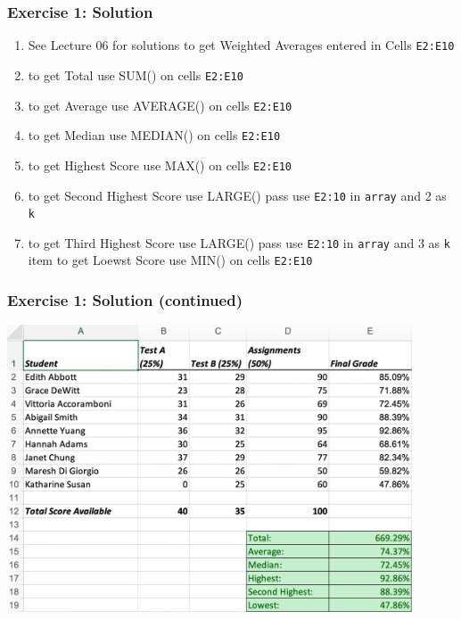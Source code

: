 \documentclass[12pt]{beamer}
\begin{document}
\begin{frame}
	\frametitle{Exercise 1: Solution}
	\begin{enumerate}
		\item See Lecture 06 for solutions to get Weighted Averages entered in Cells \texttt{E2:E10}
		\item to get Total use SUM() on cells \texttt{E2:E10}
		\item to get Average use AVERAGE() on cells \texttt{E2:E10}
		\item to get Median use MEDIAN() on cells \texttt{E2:E10}
		\item to get Highest Score use MAX() on cells \texttt{E2:E10}
		\item to get Second Highest Score use LARGE() pass use \texttt{E2:10} in \texttt{array} and 2 as \texttt{k}
		\item to get Third Highest Score use LARGE() pass use \texttt{E2:10} in \texttt{array} and 3 as \texttt{k}
		item to get Loewst Score use MIN() on cells \texttt{E2:E10}
	\end{enumerate}
\end{frame}
\begin{frame}
	\frametitle{Exercise 1: Solution (continued)}
	\begin{center}
		\includegraphics[width=0.9\textwidth]{StudentGrades2Soln.png}
	\end{center}
\end{frame}
\end{document}
